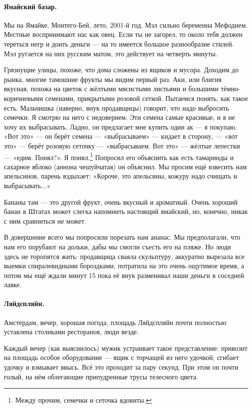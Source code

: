 \documentclass{book}
\begin{document}
\paragraph{Ямайский базар.}
Мы на Ямайке, Монтего-Бей, лето, 2001-й год.
Мэл сильно беременна Мефодием.
Местные воспринимают нас как овец.
Если ты не загорел, то около тебя должен тереться негр и доить деньги --- на то имеется большое разнообразие стилей.
Мэл ругается на них русским матом, это действует на четверть минуты.

Грязнущие улицы, похоже, что дома сложены из ящиков и мусора.
Доходим до рынка, многие тамошние фрукты мы видим первый раз.
Аки, или блигия вкусная, похожа на цветок с жёлтыми мясистыми листьями и большими тёмно-коричневыми семенами, прикрытыми розовой сеткой.
Пытаемся понять, как такое есть.
Мальчишка (наверно, внук продавщицы) говорит, что надо выбросить семечки.
Я смотрю на него с недоверием.
Эти семена самые красивые, и я не хочу их выбрасывать.
Ладно, он предлагает мне купить один ак --- я покупаю.
«Вот это» --- он берёт семена --- «выбрасываем» --- кидает в сторону, ---  «вот это» --- берёт розовую сеточку --- «выбрасываем. Вот это» --- жёлтые лепестки --- «едим. Понял?».
Я понял.\footnote{Между прочим, семечки и сеточка ядовиты.}
Попросил его объяснить как есть тамаринды и сахарное яблоко (аннона чешуйчатая) он объяснил.
Мы просим ещё взвесить нам апельсинов, парень вздыхает: «Короче, это апельсины, кожуру надо счищать и выбрасывать...» 

Бананы там --- это другой фрукт, очень вкусный и ароматный.
Очень хороший банан в Штатах может слегка напомнить настоящий ямайский, но, конечно, никак с ним сравниться не может.

В довершение всего мы попросили порезать нам ананас.
Мы предполагали, что нам его порубают на дольки, дабы мы смогли съесть его на пляже.
Но люди здесь не торопятся жить:
продавщица сваяла скульптуру, аккуратно вырезала все выемки спиралевидными бороздками, потратила на это очень ощутимое время, а потом мы ещё ждали минут 15 пока её внук разменивал наши деньги в соседней лавке.

\paragraph{Ляйдспляйн.}  
Амстердам, вечер, хорошая погода, площадь Ляйдспляйн почти полностью уставлена столиками ресторанов, люди везде.

Каждый вечер (как выяснилось) мужик устраивает такое представление:
привозит на площадь особое оборудование --- ящик с торчащей из него удочкой;
сгибает удочку и взмывает ввысь.
Всё это проходит за пару секунд.
При этом он почти голый, на нём облегающие припудренные трусы телесного цвета.
\end{document}
